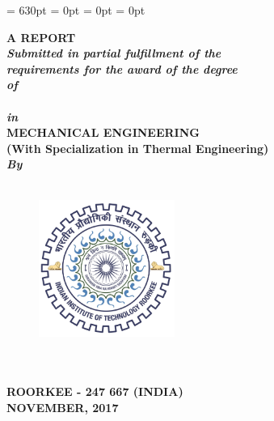 \begin{titlepage}
\renewcommand{\baselinestretch}{1.5}
 \setlength{\parindent}{0pt}
\textheight = 630pt \topmargin=0pt \voffset=1cm \headheight = 0pt
\marginparwidth= 0pt \headsep = 0pt
\pagestyle{empty}

\begin{center}
\renewcommand{\baselinestretch}{1.2}
\thispagestyle{empty}

{\Large \bfseries {\ttitle}\par}\vspace{0.4cm} %

\begingroup
    \fontsize{12pt}{12pt} \selectfont
    \bfseries
\vspace{2cm}    
{\large\textbf{A REPORT}} \\
\vspace{0.25cm}
{
{\emph{\emph{\textbf{\large\textit{Submitted in partial fulfillment of
the \\requirements for the award of the degree \\
of}}}}\\\vspace{2mm}
{\large\textbf{\degreename}}} \\
\emph{\emph{\textbf{in}}} \\
{\textbf{MECHANICAL ENGINEERING}}}\\
{\small \textbf {\textsf{(With Specialization in Thermal Engineering)}}} \\
\vspace{2cm}
{\emph {\emph{\textbf{\textit{By}}}}} \\\vspace{0.2cm}
{\large\textbf{\authorname}}\\
\endgroup
\vspace{1.5cm}
\begin{figure}[h]
  \centering
  \includegraphics[width=1.75in]{formalities/logo.jpg}
\end{figure}
\renewcommand{\baselinestretch}{1.2}
\vspace{1.5cm}
\begingroup
    \fontsize{14pt}{12pt} \selectfont
    \bfseries
\deptname\\
\univname\\
ROORKEE - 247 667 (INDIA)\\
NOVEMBER, 2017  
\endgroup
\end{center}
\end{titlepage}
